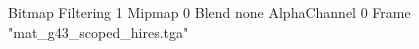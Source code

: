 {Bitmap
	{Filtering 1}
	{Mipmap 0}
	{Blend none}
	{AlphaChannel 0}
	{Frame "mat_g43_scoped_hires.tga"}
}
